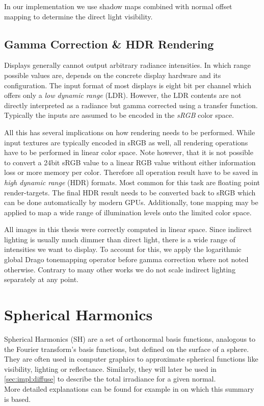 \documentclass[thesis.tex]{subfiles}
\begin{document}
In our implementation we use shadow maps combined with normal offset mapping to determine the direct light visibility.

\subsection{Gamma Correction \& HDR Rendering}
Displays generally cannot output arbitrary radiance intensities.
In which range possible values are, depends on the concrete display hardware and its configuration.
The input format of most displays is eight bit per channel which offers only a \emph{low dynamic range} (LDR).
However, the LDR contents are not directly interpreted as a radiance but gamma corrected using a transfer function.
Typically the inputs are assumed to be encoded in the \emph{sRGB} color space.

All this has several implications on how rendering needs to be performed.
While input textures are typically encoded in sRGB as well, all rendering operations have to be performed in linear color space.
Note however, that it is not possible to convert a 24bit sRGB value to a linear RGB value without either information loss or more memory per color.
Therefore all operation result have to be saved in \emph{high dynamic range} (HDR) formats.
Most common for this task are floating point render-targets.
The final HDR result needs to be converted back to sRGB which can be done automatically by modern GPUs.
Additionally, tone mapping may be applied to map a wide range of illumination levels onto the limited color space.

All images in this thesis were correctly computed in linear space.
Since indirect lighting is usually much dimmer than direct light, there is a wide range of intensities we want to display.
To account for this, we apply the logarithmic global Drago tonemapping operator \cite{bib:tonemapdrago} before gamma correction where not noted otherwise.
Contrary to many other works we do not scale indirect lighting separately at any point.

\section{Spherical Harmonics}\label{sec:preq:sh}
Spherical Harmonics (SH) are a set of orthonormal basis functions, analogous to the Fourier transform's basis functions, but defined on the surface of a sphere.
They are often used in computer graphics to approximate spherical functions like visibility, lighting or reflectance. Similarly, they will later be used in \autoref{sec:impl:diffuse} to describe the total irradiance for a given normal.
\\
More detailed explanations can be found for example in \cite{bib:grittysh, bib:stupidsh} on which this summary is based.
\end{document}
